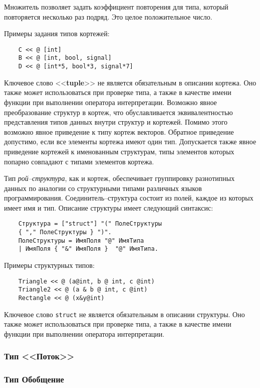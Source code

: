 {Множитель позволяет задать коэффициент повторения для типа, который повторяется несколько раз подряд. Это целое положительное число.

Примеры задания типов кортежей:

\begin{verbatim}
    С << @ [int]
    В << @ [int, bool, signal]
    D << @ [int*5, bool*3, signal*7]
\end{verbatim}

Ключевое слово <<\textbf{tuple}>> не является обязательным в описании кортежа. Оно также может использоваться при проверке типа, а также в качестве имени функции при выполнении оператора интерпретации. Возможно явное преобразование структур в кортеж, что обуславливается эквивалентностью представления типов данных внутри структур и кортежей. Помимо этого возможно явное приведение к типу кортеж векторов. Обратное приведение допустимо, если все элементы кортежа имеют один тип. Допускается также явное приведение кортежей к именованным структурам, типы элементов которых попарно совпадают с типами элементов кортежа.

Тип \textit{рой--структура}, как и кортеж, обеспечивает группировку разнотипных данных по аналогии со структурными типами различных языков программирования. Соединитель--структура состоит из полей, каждое из которых имеет имя и тип. Описание структуры имеет следующий синтаксис:

\begin{verbatim}
    Структура = ["struct"] "(" ПолеСтруктуры
    { "," ПолеСтруктуры } ")".
    ПолеСтруктуры = ИмяПоля "@" ИмяТипа
    | ИмяПоля { "&" ИмяПоля }  "@" ИмяТипа.
\end{verbatim}

Примеры структурных типов:

\begin{verbatim}
    Triangle << @ (a@int, b @ int, c @int)
    Triangle2 << @ (a & b @ int, c @int)
    Rectangle << @ (x&y@int)
\end{verbatim}

Ключевое слово \verb|struct| не является обязательным в описании структуры. Оно также может использоваться при проверке типа, а также в качестве имени функции при выполнении оператора интерпретации.


\subsubsection{Тип <<Поток>>}

\subsubsection{Тип Обобщение}

}
